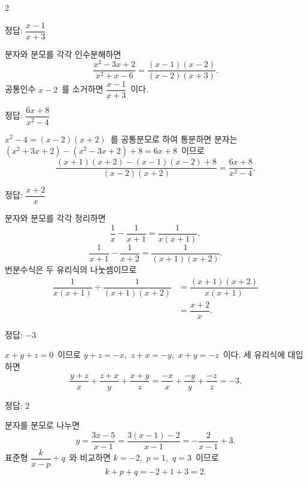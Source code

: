 \documentclass[10pt,fleqn]{article}
\begin{document}
\dmsoltitlefirsttrue
\begin{multicols*}{2}

\begin{dmanswerbox}
정답: $\dfrac{x-1}{x+3}$
\end{dmanswerbox}

분자와 분모를 각각 인수분해하면
\[ \dfrac{x^{2}-3x+2}{x^{2}+x-6}=\dfrac{(x-1)(x-2)}{(x-2)(x+3)}. \]
공통인수 $x-2$\ 를 소거하면 $\dfrac{x-1}{x+3}$\ 이다.

\begin{dmanswerbox}
정답: $\dfrac{6x+8}{x^{2}-4}$
\end{dmanswerbox}

$x^{2}-4=(x-2)(x+2)$\ 를 공통분모로 하여 통분하면 분자는 $(x^{2}+3x+2)-(x^{2}-3x+2)+8=6x+8$\ 이므로
\[ \dfrac{(x+1)(x+2)-(x-1)(x-2)+8}{(x-2)(x+2)}=\dfrac{6x+8}{x^{2}-4}. \]

\begin{dmanswerbox}
정답: $\dfrac{x+2}{x}$
\end{dmanswerbox}

분자와 분모를 각각 정리하면
\[ \dfrac{1}{x}-\dfrac{1}{x+1}=\dfrac{1}{x(x+1)}, \]
\[ \dfrac{1}{x+1}-\dfrac{1}{x+2}=\dfrac{1}{(x+1)(x+2)}. \]
번분수식은 두 유리식의 나눗셈이므로
\begin{align*}
\dfrac{1}{x(x+1)}\div\dfrac{1}{(x+1)(x+2)}
  &=\dfrac{(x+1)(x+2)}{x(x+1)} \\
  &=\dfrac{x+2}{x}.
\end{align*}

\begin{dmanswerbox}
정답: $-3$
\end{dmanswerbox}

$x+y+z=0$\ 이므로 $y+z=-x$,\ $z+x=-y$,\ $x+y=-z$\ 이다. 세 유리식에 대입하면
\[ \dfrac{y+z}{x}+\dfrac{z+x}{y}+\dfrac{x+y}{z}=\dfrac{-x}{x}+\dfrac{-y}{y}+\dfrac{-z}{z}=-3. \]
\begin{dmanswerbox}
정답: $2$
\end{dmanswerbox}

분자를 분모로 나누면
\[ y=\dfrac{3x-5}{x-1}=\dfrac{3(x-1)-2}{x-1}=-\dfrac{2}{x-1}+3. \]
표준형 $\dfrac{k}{x-p}+q$\ 와 비교하면 $k=-2$,\ $p=1$,\ $q=3$\ 이므로
\[ k+p+q=-2+1+3=2. \]


\end{multicols*}
\end{document}

